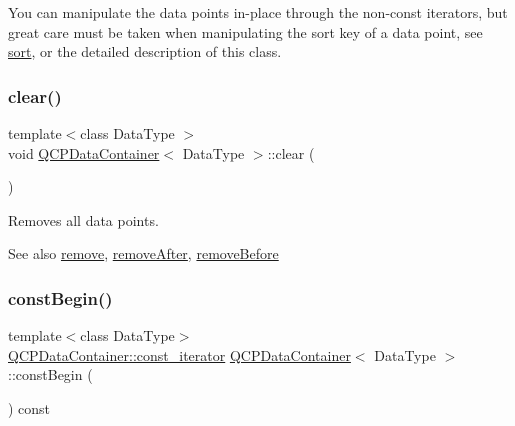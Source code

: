You can manipulate the data points in-\/place through the non-\/const iterators, but great care must be taken when manipulating the sort key of a data point, see \hyperlink{class_q_c_p_data_container_a75da92e33063b63d6da5014683591d45}{sort}, or the detailed description of this class. \mbox{\label{class_q_c_p_data_container_a7e2b29736c6fd761649bda1a54ba967f}} 
\subsubsection{\texorpdfstring{clear()}{clear()}}
{\footnotesize\ttfamily template$<$class Data\+Type $>$ \\
void \hyperlink{class_q_c_p_data_container}{Q\+C\+P\+Data\+Container}$<$ Data\+Type $>$\+::clear (\begin{DoxyParamCaption}{ }\end{DoxyParamCaption})}

Removes all data points.

\begin{DoxySeeAlso}{See also}
\hyperlink{class_q_c_p_data_container_ae5f569a120648b167efa78835f12fd38}{remove}, \hyperlink{class_q_c_p_data_container_abbe5d87ffc10b5aeffa5bb42cf03aa3c}{remove\+After}, \hyperlink{class_q_c_p_data_container_aa7f74cbce304b0369e1626c3798e1eda}{remove\+Before} 
\end{DoxySeeAlso}
\mbox{\label{class_q_c_p_data_container_a49d7622999e2de67fa2331626a3159aa}} 
\subsubsection{\texorpdfstring{const\+Begin()}{constBegin()}}
{\footnotesize\ttfamily template$<$class Data\+Type$>$ \\
\hyperlink{class_q_c_p_data_container_ae40a91f5cb0bcac61d727427449b7d15}{Q\+C\+P\+Data\+Container\+::const\+\_\+iterator} \hyperlink{class_q_c_p_data_container}{Q\+C\+P\+Data\+Container}$<$ Data\+Type $>$\+::const\+Begin (\begin{DoxyParamCaption}{ }\end{DoxyParamCaption}) const\hspace{0.3cm}{\ttfamily [inline]}}

